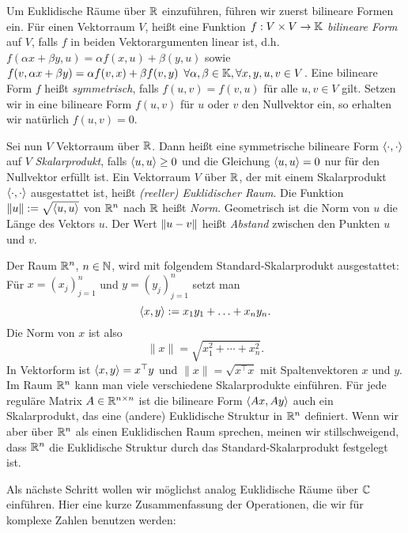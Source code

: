Um Euklidische Räume über $\mathbb R$ einzuführen, führen wir zuerst bilineare Formen ein. 
Für einen Vektorraum $V$, heißt eine Funktion $ f : V \times V \to \mathbb K $ \emph{bilineare Form} auf $ V $, falls $ f $ in beiden Vektorargumenten linear ist, d.h. $ f(\alpha x + \beta y, u) = \alpha f(x,u) + \beta(y,u) $ sowie $ f(v,\alpha x + \beta y) = \alpha f(v,x) + \beta f(v,y) \enspace \forall \alpha, \beta \in \mathbb K, \forall x,y,u,v \in V $. Eine bilineare Form $f$ heißt \emph{symmetrisch}, falls $ f(u,v) = f(v,u)$ für alle $u,v \in  V $ gilt. Setzen wir in eine bilineare Form $f(u,v)$ für $u$ oder $v$ den Nullvektor ein, so erhalten wir natürlich $f(u,v) = 0$. 


Sei nun $V$ Vektorraum über $\mathbb R$. Dann heißt eine symmetrische bilineare Form $ \left\langle \cdot,\cdot \right\rangle $ auf $V$ \emph{Skalarprodukt}, falls $ \left\langle u,u \right\rangle \geq 0 $ und die Gleichung $ \left\langle u,u \right\rangle = 0 $ nur für den Nullvektor erfüllt ist. Ein Vektorraum $V$ über $ \mathbb R $, der mit einem Skalarprodukt $ \left\langle \cdot,\cdot \right\rangle $ ausgestattet ist, heißt \emph{(reeller) Euklidischer Raum}. Die Funktion $ \left\| u \right\| := \sqrt{\left\langle u,u \right\rangle} $ von $ \mathbb R^n $ nach $ \mathbb R $ heißt \emph{Norm}. Geometrisch ist die Norm von $ u $ die Länge des Vektors $ u $. Der Wert $ \left\| u-v \right\| $ heißt \emph{Abstand} zwischen den Punkten  $ u $ und $ v $.

Der Raum $ \mathbb R^n $, $ n \in \mathbb N $, wird mit folgendem Standard-Skalarprodukt ausgestattet: Für $ x = (x_j)_{j=1}^n $ und $ y = (y_j)_{j=1}^n $ setzt man 
\[
	 \left\langle x,y \right\rangle := x_1y_1 + \ldots + x_ny_n.
\] Die Norm von $x$ ist also 
\[
	\|x\|= \sqrt{x_1^2 + \cdots + x_n^2}. 
\]
In Vektorform ist $ \left\langle x,y \right\rangle = x^\top  y $ und $\|x\| = \sqrt{x^\top x}$ mit Spaltenvektoren $ x $ und $ y $. Im Raum $\mathbb R^n$ kann man viele verschiedene Skalarprodukte einführen. Für jede reguläre Matrix $A \in \mathbb R^{n \times n}$ ist die bilineare Form $\left\langle Ax,Ay \right\rangle$ auch ein Skalarprodukt, das eine (andere) Euklidische Struktur in $\mathbb R^n$ definiert. Wenn wir aber über $\mathbb R^n$ als einen Euklidischen Raum sprechen, meinen wir stillschweigend, dass $\mathbb R^n$ die Euklidische Struktur durch das Standard-Skalarprodukt festgelegt ist. 

Als nächste Schritt wollen wir möglichst analog Euklidische Räume über $\mathbb C$ einführen. Hier eine kurze Zusammenfassung der Operationen, die wir für komplexe Zahlen benutzen werden: 

